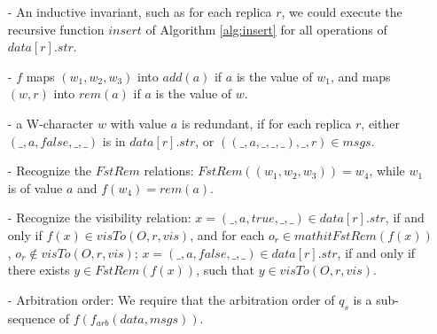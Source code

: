 \begin{itemize}
\setlength{\itemsep}{0.5pt}
\item[-] An inductive invariant, such as for each replica $r$, we could execute the recursive function $\mathit{insert}$ of Algorithm \ref{alg:insert} for all operations of  $\mathit{data}[r].\mathit{str}$. 

\item[-] $f$ maps $(w_1,w_2,w_3)$ into $\mathit{add}(a)$ if $a$ is the value of $w_1$, and maps $(w,r)$ into $\mathit{rem}(a)$ if $a$ is the value of $w$.  

\item[-] a W-character $w$ with value $a$ is redundant, if for each replica $r$, either $(\_,a,\mathit{false},\_,\_)$ is in $data[r].str$, or $((\_,a,\_,\_,\_),\_,r) \in msgs$.

\item[-] Recognize the $\mathit{FstRem}$ relations: $\mathit{FstRem}((w_1,w_2,w_3)) = w_4$, while $w_1$ is of value $a$ and $f(w_4) = \mathit{rem}(a)$. %

\item[-] Recognize the visibility relation: $x = (\_,a,\mathit{true},\_,\_) \in data[r].str$, if and only if $f(x) \in \mathit{visTo}(O,r,\mathit{vis})$, and for each $o_r \in mathit{FstRem}(f(x))$, $o_r \notin \mathit{visTo}(O,r,\mathit{vis})$; $x = (\_,a,\mathit{false},\_,\_) \in data[r].str$, if and only if there exists $y \in \mathit{FstRem}(f(x))$, such that $y \in \mathit{visTo}(O,r,\mathit{vis})$. 

\item[-] Arbitration order: We require that the arbitration order of $q_s$ is a sub-sequence of $f(f_{\mathit{arb}}(data,msgs))$.  
\end{itemize}






















































